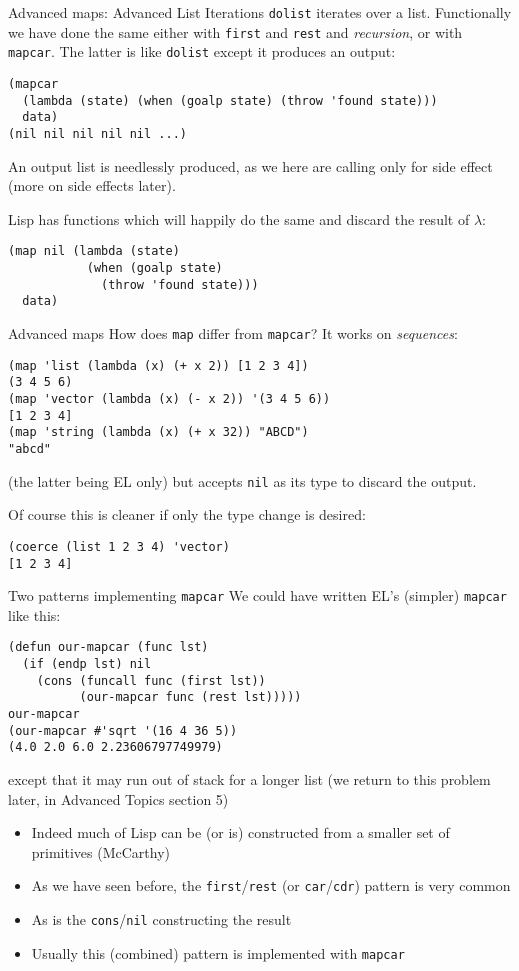 \documentclass[presentation]{beamer}
\begin{document}
\begin{frame}[fragile]{Advanced maps: Advanced List Iterations}
\texttt{dolist} iterates over a list.  Functionally we have done the same either with \texttt{first} and \texttt{rest} and \emph{recursion}, or with \texttt{mapcar}.  The latter is like \texttt{dolist} except it produces an output:
\begin{verbatim}
(mapcar
  (lambda (state) (when (goalp state) (throw 'found state)))
  data)
(nil nil nil nil nil ...)
\end{verbatim}
An output list is needlessly produced, as we here are calling only for side effect (more on side effects later).

\medskip
Lisp has functions which will happily do the same and discard the result of $\lambda$:
\begin{verbatim}
(map nil (lambda (state)
           (when (goalp state)
             (throw 'found state)))
  data)
\end{verbatim}
\end{frame}
\begin{frame}[fragile]{Advanced maps}
How does \texttt{map} differ from \texttt{mapcar}?  It works on \emph{sequences}:
\begin{verbatim}
(map 'list (lambda (x) (+ x 2)) [1 2 3 4])
(3 4 5 6)
(map 'vector (lambda (x) (- x 2)) '(3 4 5 6))
[1 2 3 4]
(map 'string (lambda (x) (+ x 32)) "ABCD")
"abcd"
\end{verbatim}
(the latter being EL only) but accepts \texttt{nil} as its type to discard the output.

\medskip
Of course this is cleaner if only the type change is desired:
\begin{verbatim}
(coerce (list 1 2 3 4) 'vector)
[1 2 3 4]
\end{verbatim}
\end{frame}

\begin{frame}[fragile]{Two patterns implementing \texttt{mapcar}}
We could have written EL's (simpler) \texttt{mapcar} like this:
\begin{verbatim}
(defun our-mapcar (func lst)
  (if (endp lst) nil
    (cons (funcall func (first lst))
          (our-mapcar func (rest lst)))))
our-mapcar
(our-mapcar #'sqrt '(16 4 36 5))
(4.0 2.0 6.0 2.23606797749979)
\end{verbatim}
except that it may run out of stack for a longer list (we return to this problem later, in Advanced Topics section 5)

\begin{itemize}
\item Indeed much of Lisp can be (or is) constructed from a smaller set of primitives (McCarthy)
\item As we have seen before, the \texttt{first}/\texttt{rest} (or \texttt{car}/\texttt{cdr}) pattern is very common
\item As is the \texttt{cons}/\texttt{nil} constructing the result
\item Usually this (combined) pattern is implemented with \texttt{mapcar}
\end{itemize}
\end{frame}
\end{document}
